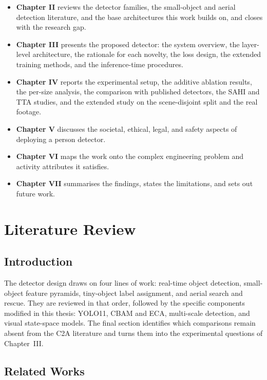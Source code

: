 \documentclass[12pt,a4paper,oneside]{report}
\begin{document}
\begin{itemize}
  \item \textbf{Chapter II} reviews the detector families, the small-object
        and aerial detection literature, and the base architectures this work
        builds on, and closes with the research gap.
  \item \textbf{Chapter III} presents the proposed detector: the system
        overview, the layer-level architecture, the rationale for each
        novelty, the loss design, the extended training methods, and the
        inference-time procedures.
  \item \textbf{Chapter IV} reports the experimental setup, the additive
        ablation results, the per-size analysis, the comparison with
        published detectors, the SAHI and TTA studies, and the extended
        study on the scene-disjoint split and the real footage.
  \item \textbf{Chapter V} discusses the societal, ethical, legal, and safety
        aspects of deploying a person detector.
  \item \textbf{Chapter VI} maps the work onto the complex engineering
        problem and activity attributes it satisfies.
  \item \textbf{Chapter VII} summarises the findings, states the limitations,
        and sets out future work.
\end{itemize}
 \newpage 
 \newpage \chapter{Literature Review}

\section{Introduction}
The detector design draws on four lines of work: real-time object detection,
small-object feature pyramids, tiny-object label assignment, and aerial search
and rescue. They are reviewed in that order, followed by the specific components
modified in this thesis: YOLO11, CBAM and ECA, multi-scale detection, and visual
state-space models. The final section identifies which comparisons remain absent
from the C2A literature and turns them into the experimental questions of
Chapter~III.

\section{Related Works}
\end{document}
